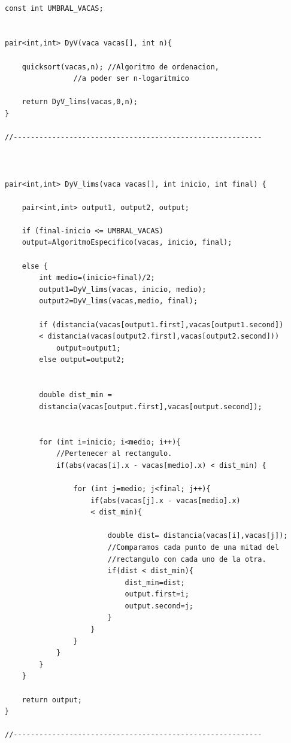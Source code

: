 \documentclass[a4paper,12pt,twoside]{article} %
\begin{document}
\lstset{language=C++}
\begin{lstlisting}

const int UMBRAL_VACAS;


pair<int,int> DyV(vaca vacas[], int n){

    quicksort(vacas,n);	//Algoritmo de ordenacion, 
    			//a poder ser n-logaritmico

    return DyV_lims(vacas,0,n);
}

//----------------------------------------------------------



pair<int,int> DyV_lims(vaca vacas[], int inicio, int final) {

    pair<int,int> output1, output2, output;

    if (final-inicio <= UMBRAL_VACAS) 
    output=AlgoritmoEspecifico(vacas, inicio, final);

    else {
        int medio=(inicio+final)/2;
        output1=DyV_lims(vacas, inicio, medio);
        output2=DyV_lims(vacas,medio, final);

        if (distancia(vacas[output1.first],vacas[output1.second]) 
        < distancia(vacas[output2.first],vacas[output2.second]))
            output=output1;
        else output=output2;

        
        double dist_min =
        distancia(vacas[output.first],vacas[output.second]);


        for (int i=inicio; i<medio; i++){
            //Pertenecer al rectangulo.
            if(abs(vacas[i].x - vacas[medio].x) < dist_min) {

                for (int j=medio; j<final; j++){
                    if(abs(vacas[j].x - vacas[medio].x) 
                    < dist_min){

                        double dist= distancia(vacas[i],vacas[j]);
                        //Comparamos cada punto de una mitad del
                        //rectangulo con cada uno de la otra.
                        if(dist < dist_min){
                            dist_min=dist;
                            output.first=i;
                            output.second=j;
                        }
                    }
                }
            }
        }
    }

    return output;
}

//----------------------------------------------------------


\end{lstlisting}
\end{document}
